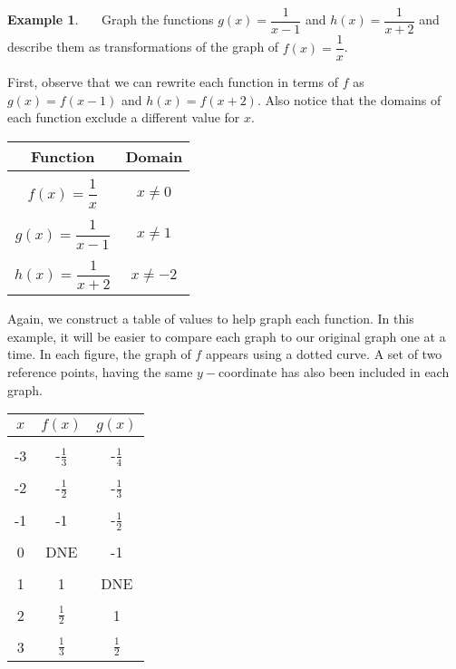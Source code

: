 \documentclass[12pt]{book}
\theoremstyle{definition}
\newtheorem{example}{Example}
\begin{document}
\begin{example}~~~Graph the functions $g(x)=\dfrac{1}{x-1}$ and $h(x)=\dfrac{1}{x+2}$ and describe them as transformations of the graph of $f(x)=\dfrac{1}{x}$.\par
First, observe that we can rewrite each function in terms of $f$ as $g(x)=f(x-1)$ and $h(x)=f(x+2)$.  Also notice that the domains of each function exclude a different value for $x$.
\begin{center}
\begin{tabular}{cc}
Function & Domain\\
\hline
&\\
$f(x)=\dfrac{1}{x}$ & $x\neq 0$\\
&\\
$g(x)=\dfrac{1}{x-1}$ & $x\neq 1$\\
&\\
$h(x)=\dfrac{1}{x+2}$ & $x\neq -2$
\end{tabular}
\end{center}
Again, we construct a table of values to help graph each function.  In this example, it will be easier to compare each graph to our original graph one at a time.  In each figure, the graph of $f$ appears using a dotted curve.  A set of two reference points, having the same $y-$coordinate has also been included in each graph.
\newpage
\begin{multicols}{2}
\begin{center}
\begin{tabular}{c||c|c}
$x$ & $f(x)$ & $g(x)$  \\
\hline
&&\\
-3 & -$\frac{1}{3}$ & -$\frac{1}{4}$  \\
&&\\
-2 & -$\frac{1}{2}$ & -$\frac{1}{3}$  \\
&&\\
-1 & -1 & -$\frac{1}{2}$  \\
&&\\
0 & DNE & -1  \\
&&\\
1 & 1 & DNE  \\
&&\\
2 & $\frac{1}{2}$ & 1  \\
&&\\
3 & $\frac{1}{3}$ & $\frac{1}{2}$  
\end{tabular}
\end{center}
\columnbreak
\begin{center}
\begin{tikzpicture}[xscale=0.67,yscale=0.67]

\end{tikzpicture}
\end{center}
\end{multicols}
\end{example}
\end{document}
